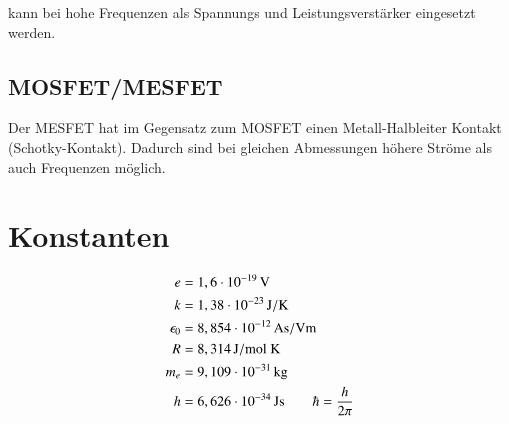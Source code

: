 kann bei hohe Frequenzen als Spannungs und Leistungsverstärker eingesetzt werden.


\subsection*{MOSFET/MESFET}


Der MESFET hat im Gegensatz zum MOSFET einen Metall-Halbleiter Kontakt (Schotky-Kontakt). Dadurch sind bei gleichen Abmessungen höhere Ströme als auch Frequenzen möglich.



\section{Konstanten}

\begin{align*}
e &= \unit[1,6 \cdot 10^{-19}]{V} \\
k &= \unit[1,38 \cdot 10^{-23}]{J/K} \\
\epsilon_0 &= \unit[8,854 \cdot 10^{-12}]{As / Vm} \\
R &= \unit[8,314]{J / mol \ K} \\
m_e &= \unit[9,109 \cdot 10^{-31}]{kg} \\
h &= \unit[6,626 \cdot 10^{-34}]{Js} \qquad \hbar = \frac{h}{2 \pi}
\end{align*}



















